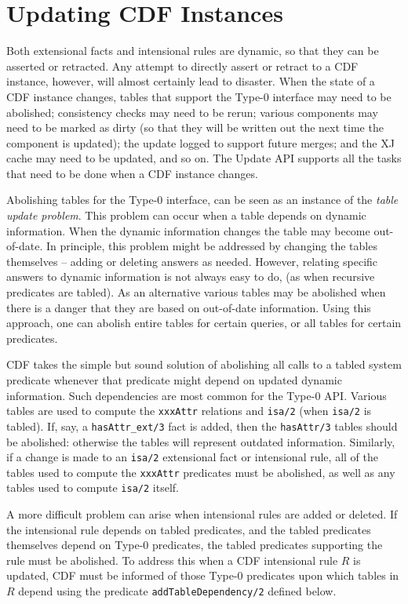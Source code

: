 \section{Updating CDF Instances} \label{sec:update}

Both extensional facts and intensional rules are dynamic, so that they
can be asserted or retracted.  Any attempt to directly assert or
retract to a CDF instance, however, will almost certainly lead to
disaster.  When the state of a CDF instance changes, tables that
support the Type-0 interface may need to be abolished; consistency
checks may need to be rerun; various components may need to be marked
as dirty (so that they will be written out the next time the component
is updated); the update logged to support future merges; and the XJ
cache may need to be updated, and so on.  The Update API supports all
the tasks that need to be done when a CDF instance changes.

Abolishing tables for the Type-0 interface, can be seen as an instance
of the {\em table update problem}.  This problem can occur when a
table depends on dynamic information.  When the dynamic information
changes the table may become out-of-date.  In principle, this problem
might be addressed by changing the tables themselves -- adding or
deleting answers as needed.  However, relating specific answers to
dynamic information is not always easy to do, (as when recursive
predicates are tabled).  As an alternative various tables may be
abolished when there is a danger that they are based on out-of-date
information.  Using this approach, one can abolish entire tables for
certain queries, or all tables for certain predicates.

CDF takes the simple but sound solution of abolishing all calls to a
tabled system predicate whenever that predicate might depend on
updated dynamic information.  Such dependencies are most common for
the Type-0 API.  Various tables are used to compute the {\tt xxxAttr}
relations and {\tt isa/2} (when {\tt isa/2} is tabled).  If, say, a
{\tt hasAttr\_ext/3} fact is added, then the {\tt hasAttr/3} tables
should be abolished: otherwise the tables will represent outdated
information.  Similarly, if a change is made to an {\tt isa/2}
extensional fact or intensional rule, all of the tables used to
compute the {\tt xxxAttr} predicates must be abolished, as well as any
tables used to compute {\tt isa/2} itself.

A more difficult problem can arise when intensional rules are added or
deleted.  If the intensional rule depends on tabled predicates, and
the tabled predicates themselves depend on Type-0 predicates, the
tabled predicates supporting the rule must be abolished.  To address
this when a CDF intensional rule $R$ is updated, CDF must be informed
of those Type-0 predicates upon which tables in $R$ depend using the
predicate {\tt addTableDependency/2} defined below.

